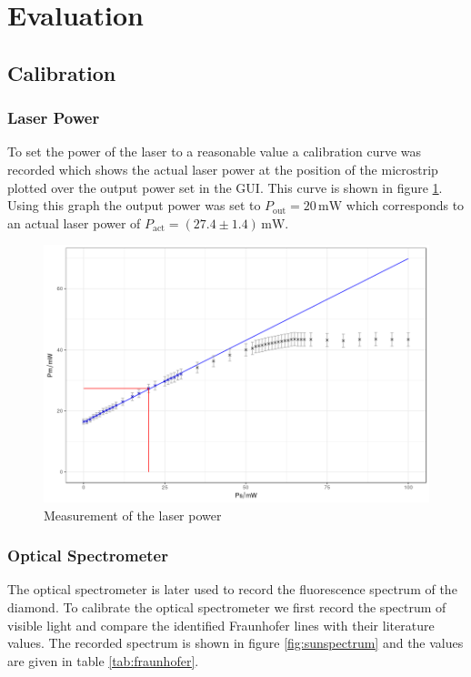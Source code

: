 \section{Evaluation}
\subsection{Calibration}
\subsubsection{Laser Power}
To set the power of the laser to a reasonable value a calibration curve was recorded which shows the actual laser power at the position of the microstrip plotted over the output power set in the GUI. This curve is shown in figure \ref{fig:power}.\\

Using this graph the output power was set to $P_\text{out}=20\,\mathrm{mW}$ which corresponds to an actual laser power of $P_\text{act}=(27.4\pm1.4)\,\mathrm{mW}$.
\begin{figure}[hb]
	\centering
	\includegraphics[width=\textwidth]{../figures/powercal.png}
	\caption{Measurement of the laser power}
	\label{fig:power}
\end{figure}

\subsubsection{Optical Spectrometer}
The optical spectrometer is later used to record the fluorescence spectrum of the diamond. To calibrate the optical spectrometer we first record the spectrum of visible light and compare the identified Fraunhofer lines with their literature values. The recorded spectrum is shown in figure \ref{fig:sunspectrum} and the values are given in table \ref{tab:fraunhofer}.\\

